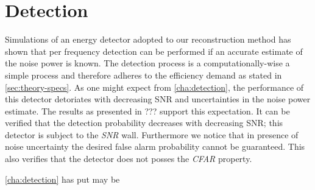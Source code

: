\documentclass[a4paper, openany, oneside]{memoir}
\begin{document}
\section{Detection}
Simulations of an energy detector adopted to our reconstruction method has shown that per frequency detection
can be performed if an accurate estimate of the noise power is known. The detection process is a computationally-wise a simple process and therefore adheres to the efficiency demand as stated in \cref{sec:theory-specs}.  As one might expect from \cref{cha:detection}, the performance of this detector detoriates with decreasing SNR and uncertainties in the noise power estimate. The results as presented in ??? support this expectation. It can be verified that the detection probability decreases with decreasing SNR; this detector is subject to the \emph{SNR} wall. Furthermore we notice that in presence of noise uncertainty the desired false alarm probability cannot be guaranteed. This also verifies that the detector does not posses the \emph{CFAR} property.

\cref{cha:detection} has put may be 
\end{document}

